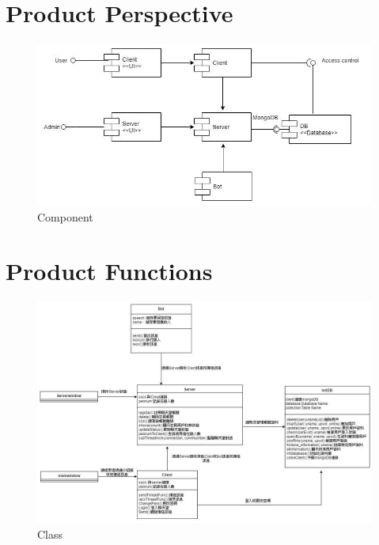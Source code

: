 \documentclass{scrreprt}
\begin{document}
\begin{CJK}{UTF8}{bkai}
\section{Product Perspective}
\begin{figure}[ht]
\begin{center}
\includegraphics[width=17cm]{Component.jpg}
\end{center}
\caption{Component}
\label{fig:1}
\end{figure}

\newpage
\section{Product Functions}
\begin{figure}[ht]
\begin{center}
\includegraphics[width=17.5cm]{Class.jpg}
\end{center}
\caption{Class}
\label{fig:1}
\end{figure}

\newpage

\end{CJK}
\end{document}
